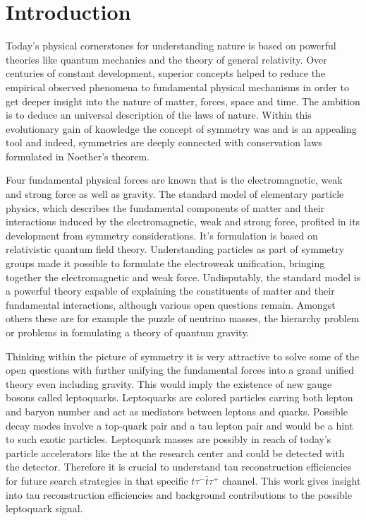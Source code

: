 \chapter{Introduction}
Today's physical cornerstones for understanding nature is based on powerful theories like quantum mechanics and the theory of general relativity. Over centuries of constant development, superior concepts helped to reduce the empirical observed phenomena to fundamental physical mechanisms in order to get deeper insight into the nature of matter, forces, space and time. The ambition is to deduce an universal description of the laws of nature. Within this evolutionary gain of knowledge the concept of symmetry was and is an appealing tool and indeed, symmetries are deeply connected with conservation laws formulated in Noether's theorem.\par
Four fundamental physical forces are known that is the electromagnetic, weak and strong force as well as gravity. The standard model of elementary particle physics, which describes the fundamental components of matter and their interactions induced by the electromagnetic, weak and strong force, profited in its development from symmetry considerations. It's formulation is based on relativistic quantum field theory. Understanding particles as part of symmetry groups made it possible to formulate the electroweak unification, bringing together the electromagnetic and weak force. Undisputably, the standard model is a powerful theory capable of explaining the constituents of matter and their fundamental interactions, although various open questions remain. Amongst others these are for example the puzzle of neutrino masses, the hierarchy problem or problems in formulating a theory of quantum gravity.\par
Thinking within the picture of symmetry it is very attractive to solve some of the open questions with further unifying the fundamental forces into a grand unified theory even including gravity. This would imply the existence of new gauge bosons called leptoquarks. Leptoquarks are colored particles carring both lepton and baryon number and act as mediators between leptons and quarks. Possible decay modes involve a top-quark pair and a tau lepton pair and would be a hint to such exotic particles. Leptoquark masses are possibly in reach of today's particle accelerators like the {\LHC} at the research center {\CERN} and could be detected with the {\ATLAS} detector. Therefore it is crucial to understand tau reconstruction efficiencies for future search strategies in that specific $t\tau^-\bar{t}\tau^+$ channel. This work gives insight into tau reconstruction efficiencies and background contributions to the possible leptoquark signal.\par
